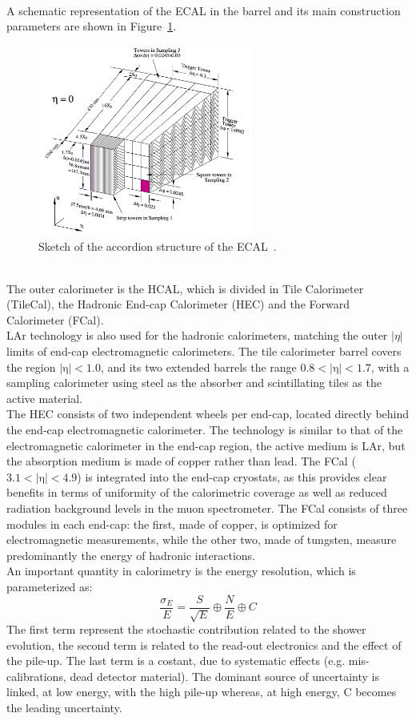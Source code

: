 \\A schematic representation of the ECAL in the barrel and its main construction parameters are shown in Figure~\ref{fig:ECAL}. 
\begin{figure}[h]
	\centering
	\includegraphics[width=7cm]{Chapters/CH2/figures/ECAL}
	\caption{Sketch of the accordion structure of the ECAL~\cite{cal}.}
	\label{fig:ECAL}
\end{figure}
\vspace{\baselineskip}
\\The outer calorimeter is the HCAL, which is divided in Tile Calorimeter (TileCal), the Hadronic End-cap Calorimeter (HEC) and the Forward Calorimeter (FCal). \\
LAr technology is also used for the hadronic calorimeters, matching the outer $|\eta|$ limits of end-cap electromagnetic calorimeters. 
The tile calorimeter barrel covers the region $\mathrm{|\eta|<1.0}$, and its two extended barrels the range $\mathrm{0.8<|\eta|<1.7}$, with a sampling calorimeter 
using steel as the absorber and scintillating tiles as the active material.\\
The HEC consists of two independent wheels per end-cap, located directly behind the end-cap electromagnetic calorimeter. The technology is similar to that of the 
electromagnetic calorimeter in the end-cap region, the active medium is LAr, but the absorption medium is made of copper rather than lead.
The FCal ($\mathrm{3.1<|\eta|<4.9}$) is integrated into the end-cap cryostats, as this provides clear benefits in terms of uniformity of the calorimetric coverage as well as reduced radiation background levels in 
the muon spectrometer. The FCal consists of three modules in each end-cap: the first, made of copper, is optimized for electromagnetic measurements, while the other two, made of tungsten, measure 
predominantly the energy of hadronic interactions.\\
An important quantity in calorimetry is the energy resolution, which is parameterized as:
\begin{equation}
\frac{\sigma_{E}}{E}=\frac{S}{\sqrt{E}} \oplus \frac{N}{E} \oplus C
\end{equation}
The first term represent the stochastic contribution related to the shower evolution, the second term
is related to the read-out electronics and the effect of the pile-up. The last term is a costant, due to systematic effects (e.g. mis-calibrations, dead detector material). 
The dominant source of uncertainty is linked, at low energy, with the high pile-up whereas, at high energy, C becomes the leading uncertainty. 

